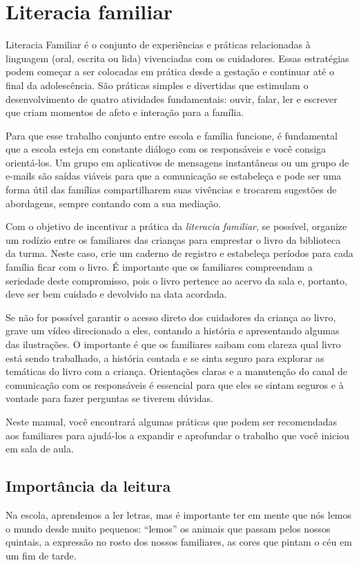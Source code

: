 \documentclass[11pt]{extarticle}
\begin{document}
\section{Literacia familiar}
Literacia Familiar é o conjunto de experiências e práticas relacionadas à linguagem (oral, escrita ou lida) vivenciadas com os cuidadores. Essas estratégias podem começar a ser colocadas em prática desde a gestação e continuar até o final da adolescência. São práticas simples e divertidas que estimulam o desenvolvimento de quatro atividades fundamentais: ouvir, falar, ler e escrever que criam momentos de afeto e interação para a família.

Para que esse trabalho conjunto entre escola e família funcione, é fundamental que a escola esteja em constante diálogo com os responsáveis e você consiga orientá-los. Um grupo em aplicativos de mensagens instantâneas ou um grupo de e-mails são saídas viáveis para que a comunicação se estabeleça e pode ser uma forma útil das famílias compartilharem suas vivências e trocarem sugestões de abordagens, sempre contando com a sua mediação.

Com o objetivo de incentivar a prática da \textit{literacia familiar}, se possível, organize um rodízio entre os familiares das crianças para emprestar o livro da biblioteca da turma. Neste caso, crie um caderno de registro e estabeleça períodos para cada família ficar com o livro. É importante que os familiares compreendam a seriedade deste compromisso, pois o livro pertence ao acervo da sala e, portanto, deve ser bem cuidado e devolvido na data acordada.

Se não for possível garantir o acesso direto dos cuidadores da criança ao livro, grave um vídeo direcionado a eles, contando a história e apresentando algumas das ilustrações. O importante é que os familiares saibam com clareza qual livro está sendo trabalhado, a história contada e se sinta seguro para explorar as temáticas do livro com a criança. Orientações claras e a manutenção do canal de comunicação com os responsáveis é essencial para que eles se sintam seguros e à vontade para fazer perguntas se tiverem dúvidas.

Neste manual, você encontrará algumas práticas que podem ser recomendadas aos familiares para ajudá-los a expandir e aprofundar o trabalho que você iniciou em sala de aula.


\subsection{Importância da leitura}
Na escola, aprendemos a ler letras, mas é importante ter em mente que nós 
lemos o mundo desde muito pequenos: “lemos” os animais que passam pelos nossos 
quintais, a expressão no rosto dos nossos familiares, as cores que pintam o céu 
em um fim de tarde. 
\end{document}
